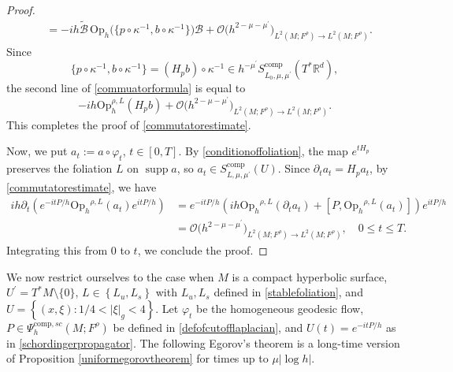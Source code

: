 \documentclass[11pt,oneside,reqno]{amsart}
\newcommand\Oph{\ensuremath{\mathrm{Op}_h}}
\theoremstyle{definition}
\numberwithin{equation}{section}
\theoremstyle{plain}
\begin{document}
\begin{proof}
\begin{equation}
\begin{aligned}
& =-i h \widetilde{\mathcal{B}} \,\mathrm{Op}_h \big(\{p \circ \kappa^{-1}, b \circ \kappa^{-1}\} \big) \mathcal{B}+\mathcal{O} \big(h^{2-\mu-\mu^{\prime}}\big)_{L^2(M;F^\rho) \rightarrow L^2(M;F^\rho)}.
\end{aligned}
\end{equation}
Since
\begin{equation*}
     \{p \circ \kappa^{-1}, b \circ \kappa^{-1}\}=(H_p b) \circ \kappa^{-1} \in h^{-\mu^{\prime}} S_{L_0, \mu, \mu^{\prime}}^{\mathrm{comp}}(T^* \mathbb{R}^d) ,
\end{equation*}
the second line of \eqref{commuatorformula} is equal to 
\begin{equation*}
    -i h \mathrm{Op}_h^{\rho,L}\left(H_p b\right)+\mathcal{O} \big(h^{2-\mu-\mu^{\prime}}\big)_{L^2(M;F^\rho) \rightarrow L^2(M;F^\rho)}.
\end{equation*}
This completes the proof of \eqref{commutatorestimate}.

Now, we put $a_t:=a \circ \varphi_{t}$, $t \in[0, T]$. By \eqref{conditionoffoliation}, the map $e^{t H_p}$ preserves the foliation $L$ on $\operatorname{supp} a$, so $a_t \in S_{L, \mu, \mu^{\prime}}^{\mathrm{comp}}(U)$. Since $\partial_t a_t=H_p a_t$, by \eqref{commutatorestimate}, we have
\begin{equation}
\begin{aligned}
i h \partial_t\left(e^{-i t P / h} \Oph^{\rho,L}\left(a_t\right) e^{i t P / h}\right) & =e^{-i t P / h}\left(i h \Oph^{\rho,L}\left(\partial_t a_t\right)+\left[P, \Oph^{\rho,L}\left(a_t\right)\right]\right) e^{i t P / h} \\
& =\mathcal{O} \big(h^{2-\mu-\mu^{\prime}}\big)_{L^2(M;F^\rho) \rightarrow L^2(M;F^\rho)}, \quad 0 \leq t \leq T.
\end{aligned}
\end{equation}
Integrating this from $0$ to $t$, we conclude the proof.
\end{proof}


We now restrict ourselves to the case when $M$ is a compact hyperbolic surface, $U^{\prime}=T^* M \setminus \{0\}$, $L \in\left\{L_u, L_s\right\}$ with $L_u, L_s$ defined in \eqref{stablefoliation}, and $U=\left\{(x,\xi): 1/4<|\xi|_g<4\right\}$. Let $\varphi_t$ be the homogeneous geodesic flow, $P \in \Psi^{\mathrm{comp},sc}_h(M;F^\rho)$ be defined in \eqref{defofcutofflaplacian}, and $U(t)=e^{-i t P / h}$ as in \eqref{schordingerpropagator}. The following Egorov's theorem is a long-time version of Proposition \ref{uniformegorovtheorem} for times up to $\mu|\log h|$.
\end{document}
